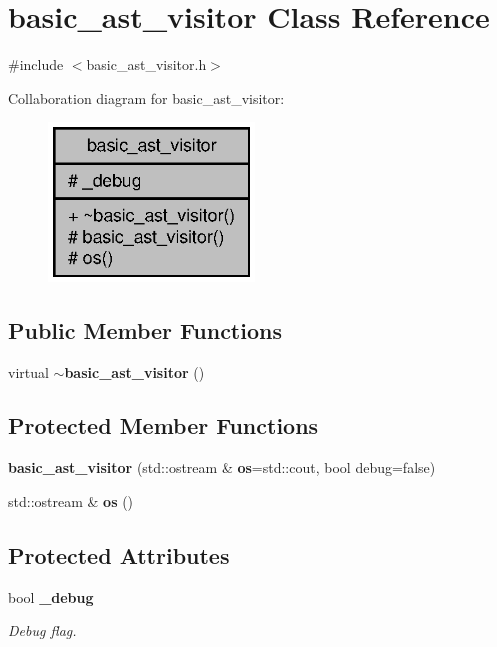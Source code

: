 \section{basic\+\_\+ast\+\_\+visitor Class Reference}
\label{classbasic__ast__visitor}


{\ttfamily \#include $<$basic\+\_\+ast\+\_\+visitor.\+h$>$}



Collaboration diagram for basic\+\_\+ast\+\_\+visitor\+:
\nopagebreak
\begin{figure}[H]
\begin{center}
\leavevmode
\includegraphics[width=155pt]{classbasic__ast__visitor__coll__graph}
\end{center}
\end{figure}
\subsection*{Public Member Functions}
\begin{DoxyCompactItemize}
\item 
virtual \textbf{ $\sim$basic\+\_\+ast\+\_\+visitor} ()
\end{DoxyCompactItemize}
\subsection*{Protected Member Functions}
\begin{DoxyCompactItemize}
\item 
\textbf{ basic\+\_\+ast\+\_\+visitor} (std\+::ostream \&\textbf{ os}=std\+::cout, bool debug=false)
\item 
std\+::ostream \& \textbf{ os} ()
\end{DoxyCompactItemize}
\subsection*{Protected Attributes}
\begin{DoxyCompactItemize}
\item 
\mbox{\label{classbasic__ast__visitor_a00d9f815e553a3313b33a952e03702f4}} 
bool \textbf{ \+\_\+debug}
\begin{DoxyCompactList}\small\item\em Debug flag. \end{DoxyCompactList}\end{DoxyCompactItemize}


